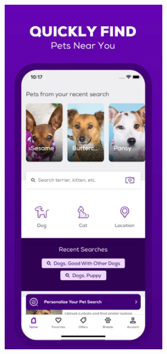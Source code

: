 \documentclass[12pt,a4paper]{report}
\begin{document}
\begin{figure}[h!]
    \centering
    \begin{subfigure}{0.22\textwidth}
        \centering
        \includegraphics[width=\textwidth]{img/petfinder1.png} %

\end{subfigure}
\end{figure}
\end{document}

